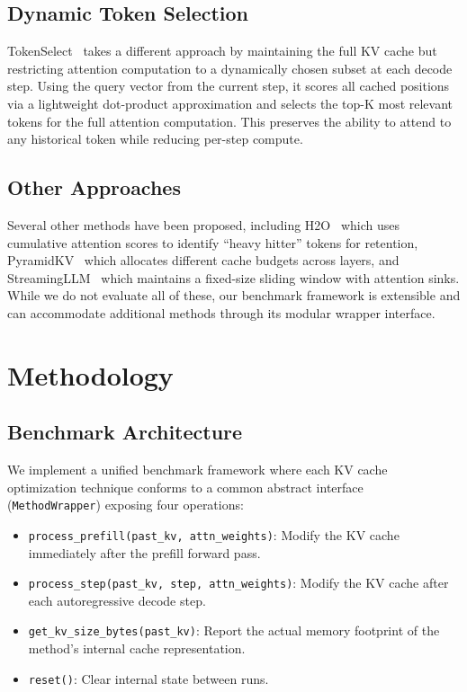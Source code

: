 \documentclass[conference]{IEEEtran}
\begin{document}
\subsection{Dynamic Token Selection}
TokenSelect~\cite{topk} takes a different approach by maintaining the full KV cache but restricting attention computation to a dynamically chosen subset at each decode step. Using the query vector from the current step, it scores all cached positions via a lightweight dot-product approximation and selects the top-K most relevant tokens for the full attention computation. This preserves the ability to attend to any historical token while reducing per-step compute.

\subsection{Other Approaches}
Several other methods have been proposed, including H2O~\cite{h2o} which uses cumulative attention scores to identify ``heavy hitter'' tokens for retention, PyramidKV~\cite{pyramidkv} which allocates different cache budgets across layers, and StreamingLLM~\cite{streamingllm} which maintains a fixed-size sliding window with attention sinks. While we do not evaluate all of these, our benchmark framework is extensible and can accommodate additional methods through its modular wrapper interface.

\section{Methodology}

\subsection{Benchmark Architecture}

We implement a unified benchmark framework where each KV cache optimization technique conforms to a common abstract interface (\texttt{MethodWrapper}) exposing four operations:

\begin{itemize}
    \item \texttt{process\_prefill(past\_kv, attn\_weights)}: Modify the KV cache immediately after the prefill forward pass.
    \item \texttt{process\_step(past\_kv, step, attn\_weights)}: Modify the KV cache after each autoregressive decode step.
    \item \texttt{get\_kv\_size\_bytes(past\_kv)}: Report the actual memory footprint of the method's internal cache representation.
    \item \texttt{reset()}: Clear internal state between runs.
\end{itemize}
\end{document}
